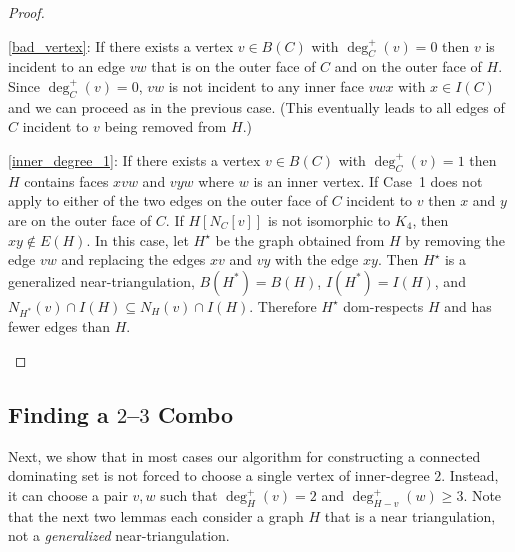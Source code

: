 \documentclass[11pt]{article}
\newcommand{\pat}[1]{\textcolor{red}{PM: #1}}
\newcommand{\hussein}[1]{\textcolor{purple}{HH: #1}}
\theoremstyle{definition}
\begin{document}
\begin{proof}
\begin{compactenum}
    \item \cref{bad_vertex}: If there exists a vertex $v\in B(C)$ with $\deg^+_C(v)=0$ then $v$ is incident to an edge $vw$ that is on the outer face of $C$ and on the outer face of $H$. Since $\deg^+_C(v)=0$, $vw$ is not incident to any inner face $vwx$ with $x\in I(C)$ and we can proceed as in the previous case.  (This eventually leads to all edges of $C$ incident to $v$ being removed from $H$.)

    \item \cref{inner_degree_1}: If there exists a vertex $v\in B(C)$ with $\deg^+_C(v)=1$ then $H$ contains faces $xvw$ and $vyw$ where $w$ is an inner vertex.  If Case~1 does not apply to either of the two edges on the outer face of $C$ incident to $v$ then $x$ and $y$ are on the outer face of $C$. If $H[N_C[v]]$ is not isomorphic to $K_4$, then $xy\not\in E(H)$.  In this case, let $H^\star$ be the graph obtained from $H$ by removing the edge $vw$ and replacing the edges $xv$ and $vy$ with the edge $xy$. Then $H^\star$ is a generalized near-triangulation, $B(H^*)=B(H)$, $I(H^*)=I(H)$, and $N_{H^*}(v)\cap I(H)\subseteq N_{H}(v)\cap I(H)$.  Therefore $H^\star$ dom-respects $H$ and has fewer edges than $H$. \qedhere

  \end{compactenum}
\end{proof}

\subsection{Finding a $2$--$3$ Combo}
\label{combo}

Next, we show that in most cases our algorithm for constructing a connected dominating set is not forced to choose a single vertex of inner-degree $2$. Instead, it can choose a pair $v,w$ such that $\deg^+_H(v)=2$ and $\deg^+_{H-v}(w)\ge 3$. Note that the next two lemmas each consider a graph $H$ that is a near triangulation, not a \emph{generalized} near-triangulation.
\end{document}
